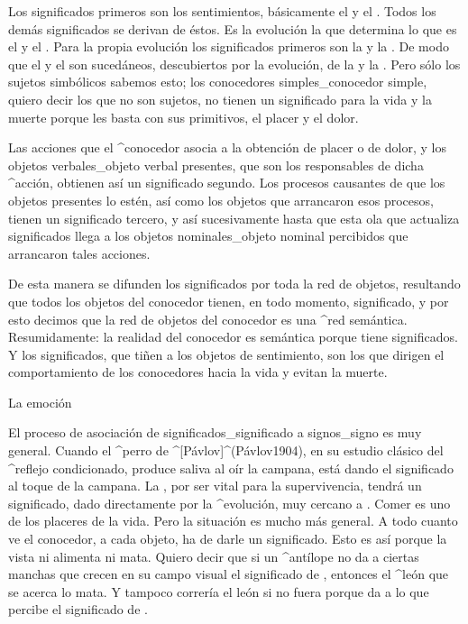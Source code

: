 Los significados primeros son los sentimientos, básicamente el
 y el . Todos los demás
significados se derivan de éstos. Es la evolución la que determina lo
que es el  y el . Para la propia
evolución los significados primeros son la  y la
. De modo que el  y el
 son sucedáneos, descubiertos por la evolución, de la
 y la . Pero sólo los sujetos simbólicos
sabemos esto; los conocedores simples_{conocedor simple}, quiero decir
los que no son sujetos, no tienen un significado para la vida y la
muerte porque les basta con sus primitivos, el placer y el dolor.

Las acciones que el ^{conocedor} asocia a la obtención de placer o de
dolor, y los objetos verbales_{objeto verbal} presentes, que son los
responsables de dicha ^{acción}, obtienen así un significado segundo.
Los procesos causantes de que los objetos presentes lo estén, así como
los objetos que arrancaron esos procesos, tienen un significado tercero,
y así sucesivamente hasta que esta ola que actualiza significados llega
a los objetos nominales_{objeto nominal} percibidos que arrancaron tales
acciones.

De esta manera se difunden los significados por toda la red de objetos,
resultando que todos los objetos del conocedor tienen, en todo momento,
significado, y por esto decimos que la red de objetos del conocedor es
una ^{red semántica}. Resumidamente: la realidad del conocedor es
semántica porque tiene significados. Y los significados, que tiñen a los
objetos de sentimiento, son los que dirigen el comportamiento de los
conocedores hacia la vida y evitan la muerte.


\Section La emoción

El proceso de asociación de significados_{significado} a signos_{signo}
es muy general. Cuando el ^{perro} de ^[Pávlov]^(Pávlov1904), en su
estudio clásico del ^{reflejo condicionado}, produce saliva al oír la
campana, está dando el significado  al toque de la
campana. La , por ser vital para la supervivencia,
tendrá un significado, dado directamente por la ^{evolución}, muy
cercano a . Comer es uno de los placeres de la vida.
Pero la situación es mucho más general. A todo cuanto ve el conocedor, a
cada objeto, ha de darle un significado. Esto es así porque la vista ni
alimenta ni mata. Quiero decir que si un ^{antílope} no da a ciertas
manchas que crecen en su campo visual el significado de , entonces el ^{león} que se acerca lo mata. Y tampoco
correría el león si no fuera porque da a lo que percibe el significado
de .

